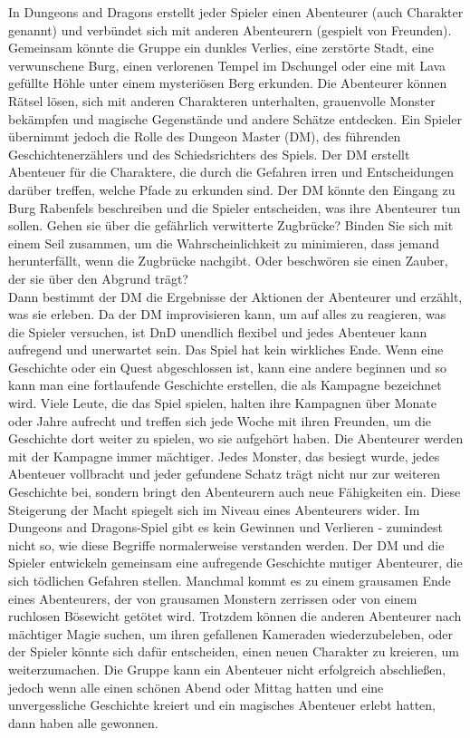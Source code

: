 In Dungeons and Dragons erstellt jeder Spieler einen Abenteurer (auch Charakter genannt) und verbündet sich mit anderen Abenteurern (gespielt von Freunden). Gemeinsam könnte die Gruppe ein dunkles Verlies, eine zerstörte Stadt, eine verwunschene Burg, einen verlorenen Tempel im Dschungel oder eine mit Lava gefüllte Höhle unter einem mysteriösen Berg erkunden. Die Abenteurer können Rätsel lösen, sich mit anderen Charakteren unterhalten, grauenvolle Monster bekämpfen und magische Gegenstände und andere Schätze entdecken. Ein Spieler übernimmt jedoch die Rolle des Dungeon Master (DM), des führenden Geschichtenerzählers und des Schiedsrichters des Spiels. Der DM erstellt Abenteuer für die Charaktere, die durch die Gefahren irren und Entscheidungen darüber treffen, welche Pfade zu erkunden sind. Der DM könnte den Eingang zu Burg Rabenfels beschreiben und die Spieler entscheiden, was ihre Abenteurer tun sollen. Gehen sie über die gefährlich verwitterte Zugbrücke? Binden Sie sich mit einem Seil zusammen, um die Wahrscheinlichkeit zu minimieren, dass jemand herunterfällt, wenn die Zugbrücke nachgibt. Oder beschwören sie einen Zauber, der sie über den Abgrund trägt? \\
Dann bestimmt der DM die Ergebnisse der Aktionen der Abenteurer und erzählt, was sie erleben. Da der DM improvisieren kann, um auf alles zu reagieren, was die Spieler versuchen, ist DnD unendlich flexibel und jedes Abenteuer kann aufregend und unerwartet sein. Das Spiel hat kein wirkliches Ende. Wenn eine Geschichte oder ein Quest abgeschlossen ist, kann eine andere beginnen und so kann man eine fortlaufende Geschichte erstellen, die als Kampagne bezeichnet wird. Viele Leute, die das Spiel spielen, halten ihre Kampagnen über Monate oder Jahre aufrecht und treffen sich jede Woche mit ihren Freunden, um die Geschichte dort weiter zu spielen, wo sie aufgehört haben. Die Abenteurer werden mit der Kampagne immer mächtiger. Jedes Monster, das besiegt wurde, jedes Abenteuer vollbracht und jeder gefundene Schatz trägt nicht nur zur weiteren Geschichte bei, sondern bringt den Abenteurern auch neue Fähigkeiten ein. Diese Steigerung der Macht spiegelt sich im Niveau eines Abenteurers wider. Im Dungeons and Dragons-Spiel gibt es kein Gewinnen und Verlieren - zumindest nicht so, wie diese Begriffe normalerweise verstanden werden. Der DM und die Spieler entwickeln gemeinsam eine aufregende Geschichte mutiger Abenteurer, die sich tödlichen Gefahren stellen. Manchmal kommt es zu einem grausamen Ende eines Abenteurers, der von grausamen Monstern zerrissen oder von einem ruchlosen Bösewicht getötet wird. Trotzdem können die anderen Abenteurer nach mächtiger Magie suchen, um ihren gefallenen Kameraden wiederzubeleben, oder der Spieler könnte sich dafür entscheiden, einen neuen Charakter zu kreieren, um weiterzumachen. Die Gruppe kann ein Abenteuer nicht erfolgreich abschließen, jedoch wenn alle einen schönen Abend oder Mittag hatten und eine unvergessliche Geschichte kreiert und ein magisches Abenteuer erlebt hatten, dann haben alle gewonnen.

